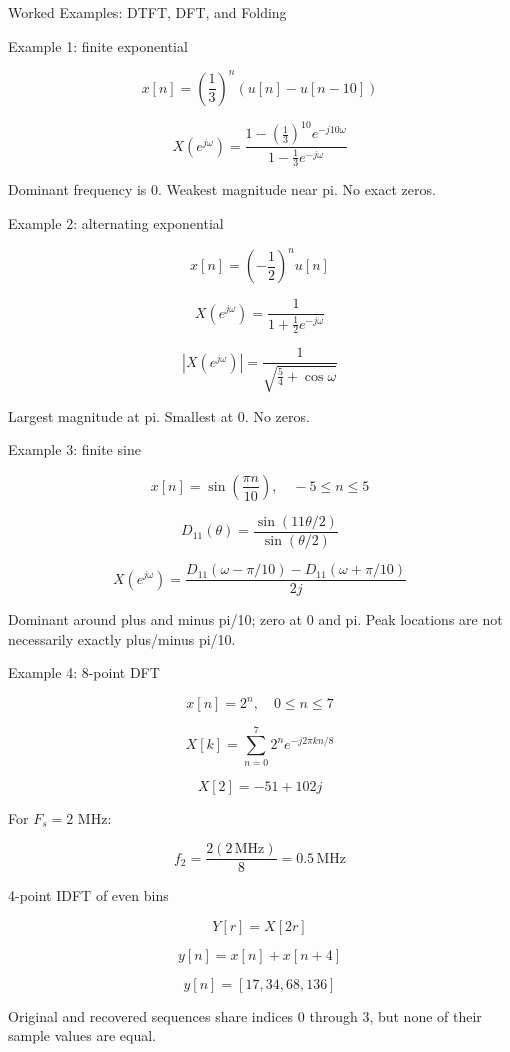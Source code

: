 Worked Examples: DTFT, DFT, and Folding

Example 1: finite exponential

$$x[n]=\left(\frac13\right)^n(u[n]-u[n-10])$$

$$X(e^{j\omega})=\frac{1-(\frac13)^{10}e^{-j10\omega}}{1-\frac13e^{-j\omega}}$$

Dominant frequency is 0. Weakest magnitude near pi. No exact zeros.

Example 2: alternating exponential

$$x[n]=\left(-\frac12\right)^nu[n]$$

$$X(e^{j\omega})=\frac{1}{1+\frac12e^{-j\omega}}$$

$$|X(e^{j\omega})|=\frac{1}{\sqrt{\frac54+\cos\omega}}$$

Largest magnitude at pi. Smallest at 0. No zeros.

Example 3: finite sine

$$x[n]=\sin\left(\frac{\pi n}{10}\right),\quad -5\le n\le5$$

$$D_{11}(\theta)=\frac{\sin(11\theta/2)}{\sin(\theta/2)}$$

$$X(e^{j\omega})=\frac{D_{11}(\omega-\pi/10)-D_{11}(\omega+\pi/10)}{2j}$$

Dominant around plus and minus pi/10; zero at 0 and pi. Peak locations are not necessarily exactly plus/minus pi/10.

Example 4: 8-point DFT

$$x[n]=2^n,\quad 0\le n\le7$$

$$X[k]=\sum_{n=0}^{7}2^ne^{-j2\pi kn/8}$$

$$X[2]=-51+102j$$

For $F_s=2$ MHz:

$$f_2=\frac{2(2\,\text{MHz})}{8}=0.5\,\text{MHz}$$

4-point IDFT of even bins

$$Y[r]=X[2r]$$

$$y[n]=x[n]+x[n+4]$$

$$y[n]=[17,34,68,136]$$

Original and recovered sequences share indices 0 through 3, but none of their sample values are equal.
